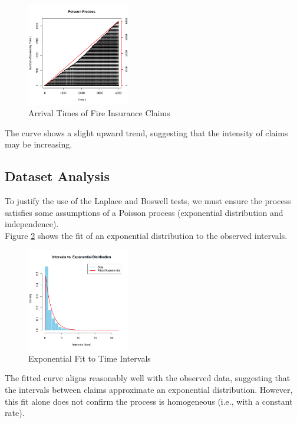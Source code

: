 \documentclass{journalstyle}
\begin{document}
\begin{figure}[H]
    \centering
    \includegraphics[width=0.4\textwidth]{src/fire_insurance_claims.png}
    \caption{Arrival Times of Fire Insurance Claims}
    \label{fig:fire_insurance_claims}
\end{figure}

The curve shows a slight upward trend, suggesting that the intensity of claims may be increasing.

\subsection{Dataset Analysis}

To justify the use of the Laplace and Boswell tests, we must ensure the process satisfies some assumptions of a Poisson process (exponential distribution and independence). \\

Figure \ref{fig:exponential_fit} shows the fit of an exponential distribution to the observed intervals. \\

\begin{figure}[H]
    \centering
    \includegraphics[width=0.4\textwidth]{src/exponential_fit.png}
    \caption{Exponential Fit to Time Intervals}
    \label{fig:exponential_fit}
\end{figure}

The fitted curve aligns reasonably well with the observed data, suggesting that the intervals between claims approximate an exponential distribution.
However, this fit alone does not confirm the process is homogeneous (i.e., with a constant rate). \\
\end{document}
